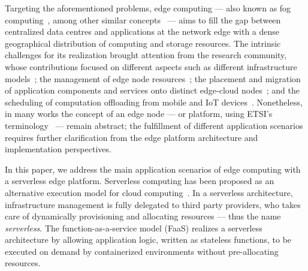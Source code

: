 \documentclass[letterpaper, 10 pt, conference]{ieeeconf}  %
\begin{document}
Targeting the aforementioned problems, edge computing --- also known as fog computing~\cite{Bonomi:2012}, among other similar concepts~\cite{Satyanarayanan:2009,Taleb:2013} --- aims to fill the gap between centralized data centres and applications at the network edge with a dense geographical distribution of computing and storage resources. The intrinsic challenges for its realization brought attention from the research community, whose contributions focused on different aspects such as different infrastructure models~\cite{}; the management of edge node resources~\cite{N.Wang:2017}; the placement and migration of application components and services onto distinct edge-cloud nodes~\cite{Wang:2015a,Wang:2017,Machen:2018}; and the scheduling of computation offloading from mobile and IoT devices~\cite{Liu:2016, OrsiniBL16}. Nonetheless, in many works the concept of an edge node --- or platform, using ETSI's terminology~\cite{ETSI:MEC:2016:03} --- remain abstract; the fulfillment of different application scenarios requires further clarification from the edge platform architecture and implementation perspectives.










In this paper, we address the main application scenarios of edge computing with a serverless edge platform. 
Serverless computing has been proposed as an alternative execution model for cloud computing~\cite{}. In a serverless architecture, infrastructure management is fully delegated to third party providers, who takes care of dynamically provisioning and allocating resources --- thus the name \textit{serverless}. The function-as-a-service model (FaaS) realizes a serverless architecture by allowing application logic, written as stateless functions, to be executed on demand by containerized environments without pre-allocating resources. 
\end{document}
